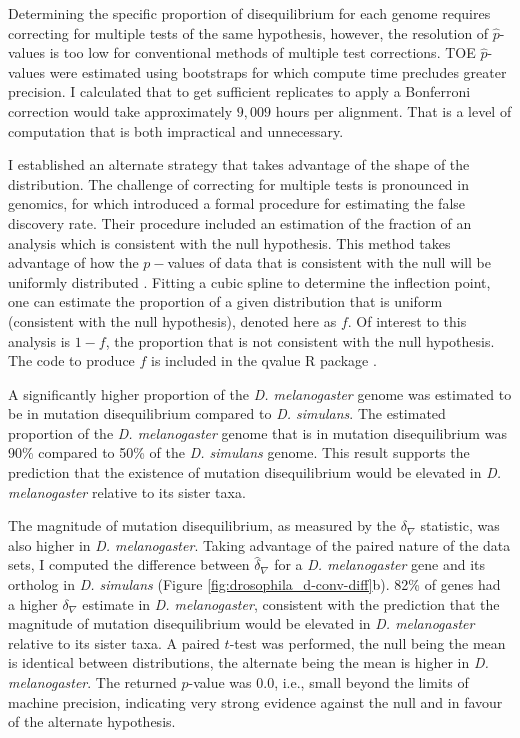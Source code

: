 

Determining the specific proportion of disequilibrium for each genome requires correcting for multiple tests of the same hypothesis, however, the resolution of $\hat p$-values is too low for conventional methods of multiple test corrections. TOE $\hat p$-values were estimated using bootstraps for which compute time precludes greater precision. I calculated that to get sufficient replicates to apply a Bonferroni correction would take approximately $9,009$ hours per alignment. That is a level of computation that is both impractical and unnecessary. 

I established an alternate strategy that takes advantage of the shape of the distribution. The challenge of correcting for multiple tests is pronounced in genomics, for which \cite{Storey2003StatisticalStudies} introduced a formal procedure for estimating the false discovery rate. Their procedure included an estimation of the fraction of an analysis which is consistent with the null hypothesis. This method takes advantage of how the $p-$values of data that is consistent with the null will be uniformly distributed \citep[see Figure 1][]{Storey2003StatisticalStudies}. Fitting a cubic spline to determine the inflection point, one can estimate the proportion of a given distribution that is uniform (consistent with the null hypothesis), denoted here as $f$. Of interest to this analysis is $1 - f$, the proportion that is not consistent with the null hypothesis. The code to produce $f$ is included in the qvalue R package \citep[\href{https://github.com/StoreyLab/qvalue}{https://github.com/StoreyLab/qvalue,}][]{Storey2004StrongApproach}.

A significantly higher proportion of the \textit{D. melanogaster} genome was estimated to be in mutation disequilibrium compared to \textit{D. simulans}. The estimated proportion of the \textit{D. melanogaster} genome that is in mutation disequilibrium was 90\% compared to 50\% of the \textit{D. simulans} genome. This result supports the prediction that the existence of mutation disequilibrium would be elevated in \textit{D. melanogaster} relative to its sister taxa.

The magnitude of mutation disequilibrium, as measured by the $\delta_\nabla$  statistic, was also higher in \textit{D. melanogaster}. Taking advantage of the paired nature of the data sets, I computed the difference between $\hat \delta_\nabla$ for a \textit{D. melanogaster} gene and its ortholog in \textit{D. simulans} (Figure \ref{fig:drosophila_d-conv-diff}b). 82\% of genes had a higher $\delta_\nabla$ estimate in \textit{D. melanogaster}, consistent with the prediction that the magnitude of mutation disequilibrium would be elevated in \textit{D. melanogaster} relative to its sister taxa. A paired $t$-test was performed, the null being the mean is identical between distributions, the alternate being the mean is higher in \textit{D. melanogaster}. The returned $p$-value was 0.0, i.e., small beyond the limits of machine precision, indicating very strong evidence against the null and in favour of the alternate hypothesis. 

